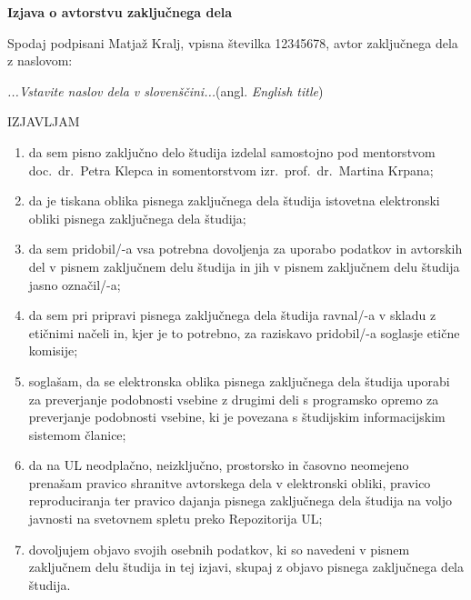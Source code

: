 \documentclass[a4paper, 12pt]{book}
\begin{document}

\pagestyle{empty}
\begin{center}
{\Large\textbf{\sc Izjava o avtorstvu zaključnega dela}}
\end{center}
%
\vspace{1mm}
\noindent Spodaj podpisani Matjaž Kralj, vpisna številka 12345678, avtor zaključnega dela z naslovom:

\vspace{1mm}
\noindent\emph{...Vstavite naslov dela v slovenščini...}\hspace{5mm}(angl. \emph{English title})

\vspace{1mm}
\begin{center}IZJAVLJAM\end{center}
\begin{enumerate}
\setlength\itemsep{0mm}
\item da sem pisno zaključno delo študija izdelal samostojno pod mentorstvom doc.\ dr.\ Petra Klepca in somentorstvom izr.\ prof.\ dr.\ Martina Krpana;
\item da je tiskana oblika pisnega zaključnega dela študija istovetna elektronski obliki pisnega zaključnega dela študija;
\item da sem pridobil/-a vsa potrebna dovoljenja za uporabo podatkov in avtorskih del v pisnem zaključnem delu študija in jih v pisnem zaključnem delu študija jasno označil/-a;
\item da sem pri pripravi pisnega zaključnega dela študija ravnal/-a v skladu z etičnimi načeli in, kjer je to potrebno, za raziskavo pridobil/-a soglasje etične komisije;
\item soglašam, da se elektronska oblika pisnega zaključnega dela študija uporabi za preverjanje podobnosti vsebine z drugimi deli s programsko opremo za preverjanje podobnosti vsebine, ki je povezana s študijskim informacijskim sistemom članice;
\item da na UL neodplačno, neizključno, prostorsko in časovno neomejeno prenašam pravico shranitve avtorskega dela v elektronski obliki, pravico reproduciranja ter pravico dajanja pisnega zaključnega dela študija na voljo javnosti na svetovnem spletu preko Repozitorija UL;
\item dovoljujem objavo svojih osebnih podatkov, ki so navedeni v pisnem zaključnem delu študija in tej izjavi, skupaj z objavo pisnega zaključnega dela študija.
\end{enumerate}
\end{document}
